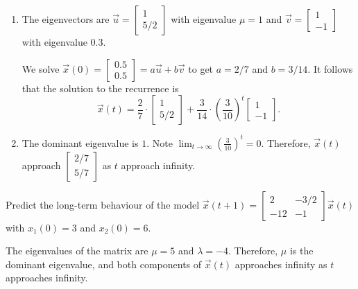 \documentclass[../main.tex]{subfiles}
\begin{document}
\begin{exercise}
\begin{solution}
\begin{enumerate}
      \item The eigenvectors are \(\vec{u} = \begin{bmatrix} 1 \\ 5/2 \end{bmatrix}\) with eigenvalue \(\mu = 1\) and \(\vec{v} = \begin{bmatrix} 1 \\ -1 \end{bmatrix}\) with eigenvalue \(0.3\).

        We solve \(\vec{x}(0) = \begin{bmatrix} 0.5 \\ 0.5 \end{bmatrix} = a \vec{u} + b \vec{v}\) to get \(a = 2/7\) and \(b = 3/14\). It follows that the solution to the recurrence is
        \[
          \vec{x}(t) = \frac{2}{7} \cdot \begin{bmatrix} 1 \\ 5/2 \end{bmatrix} + \frac{3}{14} \cdot \left( \frac{3}{10} \right)^{t} \begin{bmatrix} 1 \\ -1 \end{bmatrix}.
        \]

      \item The dominant eigenvalue is \(1\). Note \(\lim_{t \to \infty} \left( \frac{3}{10} \right)^{t} = 0\). Therefore, \(\vec{x}(t)\) approach \(\begin{bmatrix} 2/7 \\ 5/7 \end{bmatrix}\) as \(t\) approach infinity.
    \end{enumerate}
  \end{solution}
\end{exercise}

\begin{exercise}
  Predict the long-term behaviour of the model \(\vec{x}(t+1) = \begin{bmatrix} 2 & -3/2 \\ -12 & -1\end{bmatrix} \vec{x}(t)\) with \(x_{1}(0) = 3\) and \(x_{2}(0) = 6\). 

  \begin{solution}
    The eigenvalues of the matrix are \(\mu = 5\) and \(\lambda = -4\). Therefore, \(\mu\) is the dominant eigenvalue, and both components of \(\vec{x}(t)\) approaches infinity as \(t\) approaches infinity.

  \end{solution}
\end{exercise}
\end{document}
